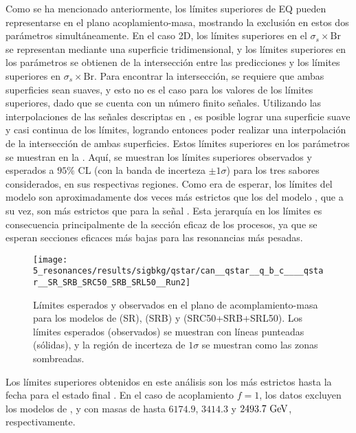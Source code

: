 Como se ha mencionado anteriormente, los límites superiores de \ac{EQ} pueden representarse en el plano acoplamiento-masa, mostrando la exclusión en estos dos parámetros simultáneamente.
En el caso 2D, los límites superiores en el \(\sigma_s \times \text{Br}\) se representan mediante una superficie tridimensional, y los límites superiores en los parámetros se obtienen de la intersección entre las predicciones y los límites superiores en \(\sigma_s \times \text{Br}\). Para encontrar la intersección, se requiere que ambas superficies sean suaves, y esto no es el caso para los valores de los límites superiores, dado que se cuenta con un número finito señales. Utilizando las interpolaciones de las señales descriptas en \Sect{\ref{sec:signals:modeling}}, es posible lograr una superficie suave y casi continua de los límites, logrando entonces poder realizar una interpolación de la intersección de ambas superficies. Estos límites superiores en los parámetros se muestran en la \Fig{\ref{fig:results:results:bkgsig:results:qstar:limits_2d}}. Aquí, se muestran los límites superiores observados y esperados a \(95\%\) \ac{CL} (con la banda de incerteza \(\pm 1 \sigma\)) para los tres sabores considerados, en sus respectivas regiones. Como era de esperar, los límites del modelo \qstar son aproximadamente dos veces más estrictos que los del modelo \cstar, que a su vez, son más estrictos que para la señal \bstar. Esta jerarquía en los límites es consecuencia principalmente de la sección eficaz de los procesos, ya que se esperan secciones eficaces más bajas para las resonancias más pesadas.

\begin{figure}[ht!]
    \centering
    \texttt{[image: 5\_resonances/results/sigbkg/qstar/can\_\_qstar\_\_q\_b\_c\_\_\_\_qstar\_\_SR\_SRB\_SRC50\_SRB\_SRL50\_\_Run2]}
    \caption{Límites esperados y observados en el plano de acomplamiento-masa para los modelos de \qstar (SR), \bstar (SRB) y \cstar (SRC50+SRB+SRL50). Los límites esperados (observados) se muestran con líneas punteadas (sólidas), y la región de incerteza de \(1\sigma\) se muestran como las zonas sombreadas.}
    \label{fig:results:results:bkgsig:results:qstar:limits_2d}
\end{figure}

Los límites superiores obtenidos en este análisis son los más estrictos hasta la fecha para el estado final \gammajet. En el caso de acoplamiento \(f=1\), los datos excluyen los modelos de \qstar, \cstar y \bstar con masas de hasta \(6174.9\), \(3414.3\) y \(2493.7~\text{GeV}\), respectivamente.



